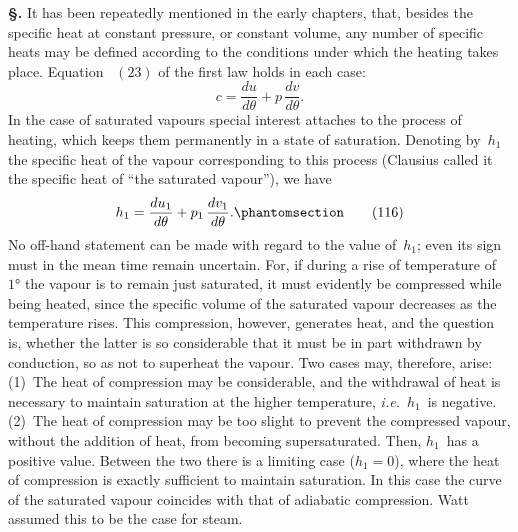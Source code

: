 \documentclass[12pt]{book}[2005/09/16]
\newcommand{\Section}[1]{
  \medskip\par\textbf{§\;#1}
  \label{section:#1}
}
\newcommand{\Tag}[1]{%
  \phantomsection\label{eqn:#1}\tag*{\ensuremath{#1}}%
}
\newcommand{\Eq}[1]{%
  \hyperref[eqn:#1]{\ensuremath{#1}}%
}
\newcommand{\PageSep}[1]{\ignorespaces}
\newcommand{\ie}{\emph{i.e.}}
\begin{document}
\Section{184.} It has been repeatedly mentioned in the early
chapters, that, besides the specific heat at constant pressure,
%
or constant volume, any number of specific heats may be
defined according to the conditions under which the heating
takes place. Equation~\Eq{(23)} of the first law holds in each
case:
\[
c = \frac{du}{d\theta} + p\, \frac{dv}{d\theta}.
\]
In the case of saturated vapours special interest attaches
to the process of heating, which keeps them permanently in
a state of saturation. Denoting by~$h_{1}$ the specific heat of
the vapour corresponding to this process (Clausius called it
the specific heat of ``the saturated vapour''), we have
\[
h_{1} = \frac{du_{1}}{d\theta} + p_{1}\, \frac{dv_{1}}{d\theta}.
\Tag{(116)}
\]
No off-hand statement can be made with regard to the
value of~$h_{1}$; even its sign must in the mean time remain
uncertain. For, if during a rise of temperature of~$1°$ the
vapour is to remain just saturated, it must evidently be
compressed while being heated, since the specific volume of
the saturated vapour decreases as the temperature rises.
This compression, however, generates heat, and the question
is, whether the latter is so considerable that it must be in
part withdrawn by conduction, so as not to superheat the
vapour. Two cases may, therefore, arise: (1)~The heat of
compression may be considerable, and the withdrawal of
heat is necessary to maintain saturation at the higher
temperature, \ie\ $h_{1}$~is negative. (2)~The heat of compression
may be too slight to prevent the compressed vapour,
\PageSep{151}
without the addition of heat, from becoming supersaturated.
Then, $h_{1}$~has a positive value. Between the two there is a
limiting case ($h_{1} = 0$), where the heat of compression is
exactly sufficient to maintain saturation. In this case the
curve of the saturated vapour coincides with that of
adiabatic compression. Watt assumed this to be the case
for steam.
\end{document}

